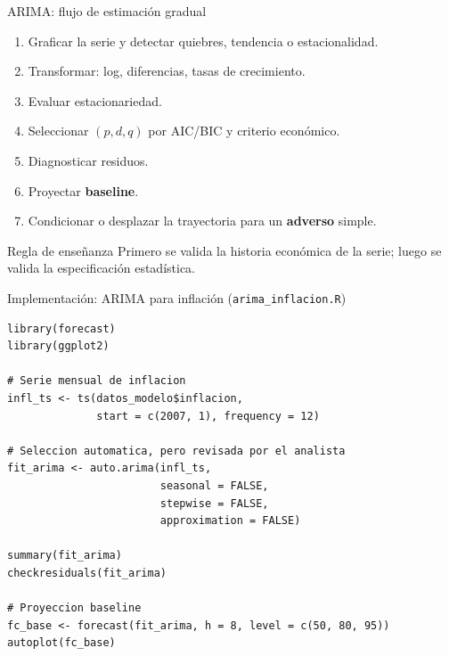 \documentclass[10pt,aspectratio=169]{beamer}
\newcommand{\baseline}{\textcolor{MacropolTeal}{\textbf{baseline}}}
\newcommand{\adverso}{\textcolor{red!70!black}{\textbf{adverso}}}
\begin{document}
\begin{frame}{ARIMA: flujo de estimación gradual}
\begin{enumerate}
  \item Graficar la serie y detectar quiebres, tendencia o estacionalidad.
  \item Transformar: log, diferencias, tasas de crecimiento.
  \item Evaluar estacionariedad.
  \item Seleccionar $(p,d,q)$ por AIC/BIC y criterio económico.
  \item Diagnosticar residuos.
  \item Proyectar \baseline{}.
  \item Condicionar o desplazar la trayectoria para un \adverso{} simple.
\end{enumerate}

\vspace{0.4em}
\begin{block}{Regla de enseñanza}
Primero se valida la historia económica de la serie; luego se valida la especificación estadística.
\end{block}
\end{frame}

\begin{frame}[fragile]{Implementación: ARIMA para inflación (\texttt{arima\_inflacion.R})}
\begin{lstlisting}
library(forecast)
library(ggplot2)

# Serie mensual de inflacion
infl_ts <- ts(datos_modelo$inflacion,
              start = c(2007, 1), frequency = 12)

# Seleccion automatica, pero revisada por el analista
fit_arima <- auto.arima(infl_ts,
                        seasonal = FALSE,
                        stepwise = FALSE,
                        approximation = FALSE)

summary(fit_arima)
checkresiduals(fit_arima)

# Proyeccion baseline
fc_base <- forecast(fit_arima, h = 8, level = c(50, 80, 95))
autoplot(fc_base)
\end{lstlisting}
\end{frame}
\end{document}
